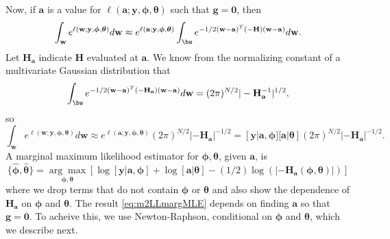 \documentclass[12pt, titlepage]{article}
\begin{document}
Now, if $\mathbf{a}$ is a value for $\ell(\mathbf{a};\mathbf{y},\boldsymbol{\phi},\boldsymbol{\theta})$ such that $\mathbf{g} = \mathbf{0}$, then
$$
\int_\mathbf{w} e^{\ell(\mathbf{w};\mathbf{y},\boldsymbol{\phi},\boldsymbol{\theta})} d\mathbf{w} \approx e^{\ell(\mathbf{a};\mathbf{y},\boldsymbol{\phi},\boldsymbol{\theta})} \int_\bw e^{ -  
	1/2(\mathbf{w} - \mathbf{a})^{T}(-\mathbf{H})(\mathbf{w} - \mathbf{a})} d\mathbf{w}.
$$
Let $\mathbf{H}_\mathbf{a}$ indicate $\mathbf{H}$ evaluated at $\mathbf{a}$. We know from the normalizing constant of a multivariate Gaussian distribution that 
$$
\int_\bw e^{-1/2(\mathbf{w} - \mathbf{a})^{T}(-\mathbf{H}_{\mathbf{a}})(\mathbf{w} - \mathbf{a})} d\mathbf{w} = (2\pi)^{N/2}|-\mathbf{H}^{-1}_\mathbf{a}|^{1/2},
$$
so
\[
\int_\mathbf{w} e^{\ell(\mathbf{w};\mathbf{y},\boldsymbol{\phi},\boldsymbol{\theta})} d\mathbf{w} \approx e^{\ell(\mathbf{a};\mathbf{y},\boldsymbol{\phi},\boldsymbol{\theta})} (2\pi)^{N/2}|-\mathbf{H}_\mathbf{a}|^{-1/2} = [\mathbf{y}|\mathbf{a},\boldsymbol{\phi}][\mathbf{a}|\boldsymbol{\theta}](2\pi)^{N/2}|-\mathbf{H}_\mathbf{a}|^{-1/2}.
\]
A marginal maximum likelihood estimator for $\boldsymbol{\phi}, \boldsymbol{\theta}$, given $\mathbf{a}$, is
\begin{equation} \label{eq:m2LLmargMLE}
\{\hat{\boldsymbol{\phi}}, \hat{\boldsymbol{\theta}} \} = \underset{\boldsymbol{\phi},\boldsymbol{\theta}}{\arg\max} \left[ \log[\mathbf{y}|\mathbf{a},\mathbf{\phi}] +
	\log[\mathbf{a}|\mathbf{\theta}] - (1/2)\log(|-\mathbf{H}_\mathbf{a}(\boldsymbol{\phi},\boldsymbol{\theta})|) \right]
\end{equation}
where we drop terms that do not contain $\boldsymbol{\phi}$ or $\boldsymbol{\theta}$ and also show the dependence of $\mathbf{H}_\mathbf{a}$ on $\boldsymbol{\phi}$ and $\boldsymbol{\theta}$.  The result \eqref{eq:m2LLmargMLE} depends on finding $\mathbf{a}$ so that $\mathbf{g} = \mathbf{0}$.  To acheive this, we use Newton-Raphson, conditional on $\boldsymbol{\phi}$ and $\boldsymbol{\theta}$, which we describe next.
\end{document}
